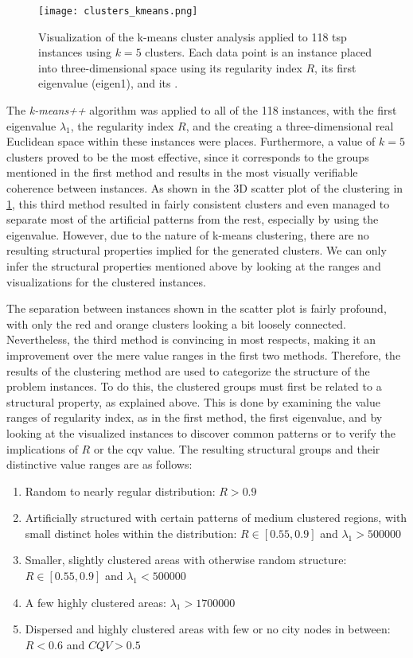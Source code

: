 \begin{figure}
	\centering
	\texttt{[image: clusters\_kmeans.png]}
	\caption[Visualization of the k-means cluster analysis]{Visualization of the k-means cluster analysis applied to 118 \gls{tsp} instances using $k=5$ clusters. Each data point is an instance placed into three-dimensional space using its regularity index $R$, its first eigenvalue (eigen1), and its .}
	\label{fig:clusters-kmeans}
\end{figure}

The \textit{k-means++} algorithm was applied to all of the 118 instances, with the first eigenvalue $\lambda_1$, the regularity index $R$, and the  creating a three-dimensional real Euclidean space within these instances were places. Furthermore, a value of $k = 5$ clusters proved to be the most effective, since it corresponds to the groups mentioned in the first method and results in the most visually verifiable coherence between instances. As shown in the 3D scatter plot of the clustering in \cref{fig:clusters-kmeans}, this third method resulted in fairly consistent clusters and even managed to separate most of the artificial patterns from the rest, especially by using the eigenvalue. However, due to the nature of k-means clustering, there are no resulting structural properties implied for the generated clusters. We can only infer the structural properties mentioned above by looking at the ranges and visualizations for the clustered instances.
 
 The separation between instances shown in the scatter plot is fairly profound, with only the red and orange clusters looking a bit loosely connected. Nevertheless, the third method is convincing in most respects, making it an improvement over the mere value ranges in the first two methods. Therefore, the results of the clustering method are used to categorize the structure of the problem instances. To do this, the clustered groups must first be related to a structural property, as explained above. This is done by examining the value ranges of regularity index, as in the first method, the first eigenvalue, and by looking at the visualized instances to discover common patterns or to verify the implications of $R$ or the \gls{cqv} value. The resulting structural groups and their distinctive value ranges are as follows:
 
 \begin{enumerate}
 	\item Random to nearly regular distribution: $R > 0.9$
 	\item Artificially structured with certain patterns of medium clustered regions, with small distinct holes within the distribution: $R \in [0.55, 0.9]$ and $\lambda_1 > 500 000$
 	\item Smaller, slightly clustered areas with otherwise random structure: $R \in [0.55, 0.9]$ and $\lambda_1 < 500 000$
 	\item A few highly clustered areas: $\lambda_1 > 1 700 000$
 	\item Dispersed and highly clustered areas with few or no city nodes in between: $R < 0.6$ and $CQV > 0.5$ \end{enumerate}

